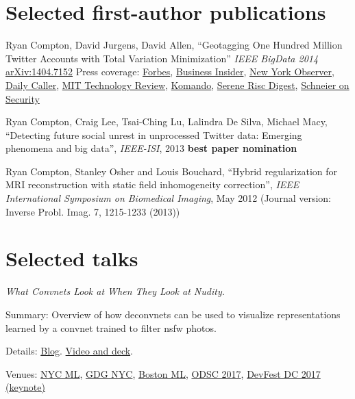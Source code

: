 \documentclass[margin,line]{res}
\newenvironment{list1}{
  \begin{list}{\ding{113}}{%
      \setlength{\itemsep}{0.0in}
      \setlength{\parsep}{0in} \setlength{\parskip}{0in}
      \setlength{\topsep}{0in} \setlength{\partopsep}{0in}
      \setlength{\leftmargin}{0.17in}}}{\end{list}}
\begin{document}
\begin{resume}
\section{\sc Selected first-author publications}

Ryan Compton, David Jurgens, David Allen, ``Geotagging One Hundred Million Twitter Accounts with Total Variation Minimization'' {\it IEEE BigData 2014} \href{https://arxiv.org/abs/1404.7152}{arXiv:1404.7152} Press coverage: \href{http://www.forbes.com/sites/thomasbrewster/2015/03/07/twitter-location-can-be-determined-through-friends/}{Forbes}, \href{http://www.businessinsider.com/twitter-location-research-at-mentions-cornell-2015-3}{Business Insider}, \href{http://observer.com/2015/03/you-dont-have-to-geotag-your-tweets-to-give-away-your-location/}{New York Observer}, \href{http://dailycaller.com/2015/03/06/how-your-tweets-can-reveal-your-real-location/}{Daily Caller}, \href{http://www.technologyreview.com/view/527246/other-interesting-arxiv-papers-week-ending-may-10-2014/}{MIT Technology Review}, \href{http://www.komando.com/happening-now/299085/forget-gps-hackers-can-pinpoint-your-exact-location-using-social-media/all}{Komando}, \href{http://ryancompton.net/assets/resume/Serene_Risc_Digest_2015_Spring.pdf}{Serene Risc Digest}, \href{http://www.schneier.com/blog/archives/2015/03/geotagging_twit.html}{Schneier on Security}

Ryan Compton, Craig Lee, Tsai-Ching Lu, Lalindra De Silva, Michael Macy, ``Detecting future social unrest in unprocessed Twitter data: Emerging phenomena and big data'', {\it IEEE-ISI}, 2013 {\bf best paper nomination}

Ryan Compton, Stanley Osher and Louis Bouchard, ``Hybrid regularization for MRI reconstruction with static field inhomogeneity correction'', {\it IEEE International Symposium on Biomedical Imaging}, May 2012 (Journal version: Inverse Probl. Imag. 7, 1215-1233 (2013))

\section{\sc Selected talks}

{\it What Convnets Look at When They Look at Nudity.}
\begin{list1}
\item [] Summary: Overview of how deconvnets can be used to visualize representations learned by a convnet trained to filter nsfw photos.
\item [] Details: \href{http://blog.clarifai.com/what-convolutional-neural-networks-see-at-when-they-see-nudity/}{Blog}. \href{http://ryancompton.net/2016/12/06/my-talk-at-the-nyc-machine-learning-meetup/}{Video and deck}.
\item [] Venues: \href{https://www.meetup.com/NYC-Machine-Learning/events/235535192/}{NYC ML}, \href{https://www.meetup.com/gdgnyc/events/231372185/}{GDG NYC}, \href{https://www.meetup.com/bostonml/events/235419742/}{Boston ML}, \href{https://www.odsc.com/training/portfolio/convolutional-neural-networks-look-look-nudity}{ODSC 2017}, \href{http://www.devfestdc.org/speakers/ryan-compton/}{DevFest DC 2017 (keynote)}
\end{list1}


\end{resume}
\end{document}

